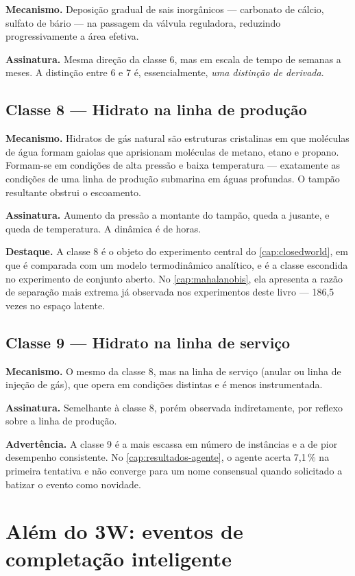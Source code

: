 \textbf{Mecanismo.} Deposição gradual de sais inorgânicos --- carbonato de cálcio,
sulfato de bário --- na passagem da válvula reguladora, reduzindo progressivamente a
área efetiva.

\textbf{Assinatura.} Mesma direção da classe 6, mas em escala de tempo de semanas a
meses. A distinção entre 6 e 7 é, essencialmente, \emph{uma distinção de derivada}.

\subsection{Classe 8 --- Hidrato na linha de produção}

\textbf{Mecanismo.} Hidratos de gás natural são estruturas cristalinas em que moléculas
de água formam gaiolas que aprisionam moléculas de metano, etano e propano. Formam-se
em condições de alta pressão e baixa temperatura --- exatamente as condições de uma
linha de produção submarina em águas profundas. O tampão resultante obstrui o
escoamento.

\textbf{Assinatura.} Aumento da pressão a montante do tampão, queda a jusante, e queda
de temperatura. A dinâmica é de horas.

\textbf{Destaque.} A classe 8 é o objeto do experimento central do
\cref{cap:closedworld}, em que é comparada com um modelo termodinâmico analítico, e é
a classe escondida no experimento de conjunto aberto. No \cref{cap:mahalanobis}, ela
apresenta a razão de separação mais extrema já observada nos experimentos deste livro
--- 186,5 vezes no espaço latente.

\subsection{Classe 9 --- Hidrato na linha de serviço}

\textbf{Mecanismo.} O mesmo da classe 8, mas na linha de serviço (anular ou linha de
injeção de gás), que opera em condições distintas e é menos instrumentada.

\textbf{Assinatura.} Semelhante à classe 8, porém observada indiretamente, por reflexo
sobre a linha de produção.

\textbf{Advertência.} A classe 9 é a mais escassa em número de instâncias e a de pior
desempenho consistente. No \cref{cap:resultados-agente}, o agente acerta 7,1\,\% na
primeira tentativa e não converge para um nome consensual quando solicitado a batizar
o evento como novidade.

\section{Além do 3W: eventos de completação inteligente}
\label{sec:dominio-icv}


